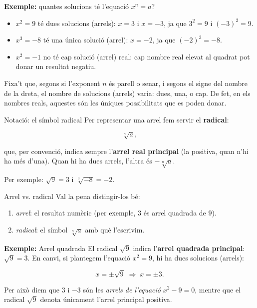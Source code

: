 \begin{exemple}{\textbf{Exemple:} quantes solucions té l'equació $x^n=a$?}
\begin{itemize}
\item $x^2=9$ té dues solucions (arrels): $x=3$ i $x=-3$, ja que $3^2=9$ i $(-3)^2=9$.
\item $x^3=-8$ té una única solució (arrel): $x=-2$, ja que $(-2)^3=-8$.
\item $x^2=-1$ no té cap solució (arrel) real: cap nombre real elevat al quadrat pot donar un resultat negatiu.
\end{itemize}

Fixa't que, segons si l'exponent $n$ és parell o senar, i segons el signe del nombre de la dreta, el nombre de solucions (arrels) varia: dues, una, o cap. De fet, en els nombres reals, aquestes són les úniques possibilitats que es poden donar.
\end{exemple}

\begin{nota}{Notació: el símbol radical}
Per representar una arrel fem servir el \textbf{radical}:

\[
\sqrt[n]{a},
\]

que, per convenció, indica sempre l'\textbf{arrel real principal} (la positiva, quan n'hi ha més d'una). Quan hi ha dues arrels, l'altra és $-\sqrt[n]{a}$.

Per exemple: $\sqrt{9}=3$ i $\sqrt[3]{-8}=-2$.
\end{nota}

\begin{nota}{Arrel vs. radical}
Val la pena distingir-los bé:

\begin{enumerate}
\item \emph{arrel}: el resultat numèric (per exemple, $3$ és arrel quadrada de $9$).
\item \emph{radical}: el símbol $\sqrt[n]{a}$ amb què l'escrivim.
\end{enumerate}
\end{nota}

\begin{exemple}{\textbf{Exemple:} Arrel quadrada}
El radical $\sqrt{9}$ indica l'\textbf{arrel quadrada principal}: $\sqrt{9}=3$. En canvi, si plantegem l'equació $x^2=9$, hi ha dues solucions (arrels):

\[
x=\pm\sqrt{9} \;\Rightarrow\; x=\pm 3.
\]

Per això diem que $3$ i $-3$ són les \emph{arrels de l'equació} $x^2-9=0$, mentre que el radical $\sqrt{9}$ denota únicament l'arrel principal positiva.
\end{exemple}

